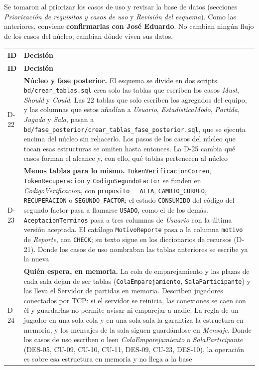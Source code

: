 Se tomaron al priorizar los casos de uso y revisar la base de datos (secciones \textit{Priorización de requisitos y casos de uso} y \textit{Revisión del esquema}). Como las anteriores, conviene \textbf{confirmarlas con José Eduardo}. No cambian ningún flujo de los casos del núcleo; cambian dónde viven sus datos.

\begin{center}\small
\begin{longtable}{|L{0.082\textwidth}|L{0.818\textwidth}|}
\hline
\textbf{ID} & \textbf{Decisión} \\ \hline
\endfirsthead
\hline
\textbf{ID} & \textbf{Decisión} \\ \hline
\endhead
\mbox{D-22} & \textbf{Núcleo y fase posterior.} El esquema se divide en dos scripts. \texttt{bd/crear\_\allowbreak{}tablas.sql} crea solo las tablas que escriben los casos \textit{Must}, \textit{Should} y \textit{Could}. Las 22 tablas que solo escriben los agregados del equipo, y las columnas que estos añadían a \textit{Usuario}, \textit{EstadisticaModo}, \textit{Partida}, \textit{Jugada} y \textit{Sala}, pasan a \texttt{bd/fase\_\allowbreak{}posterior/\allowbreak{}crear\_\allowbreak{}tablas\_\allowbreak{}fase\_\allowbreak{}posterior.sql}, que se ejecuta encima del núcleo sin rehacerlo. Los pasos de los casos del núcleo que tocan esas estructuras se omiten hasta entonces. La \mbox{D-25} cambia qué casos forman el alcance y, con ello, qué tablas pertenecen al núcleo \\ \hline
\mbox{D-23} & \textbf{Menos tablas para lo mismo.} \texttt{TokenVerificacionCorreo}, \texttt{TokenRecuperacion} y \texttt{CodigoSegundoFactor} se funden en \textit{CodigoVerificacion}, con \texttt{proposito} = \texttt{ALTA}, \texttt{CAMBIO\_\allowbreak{}CORREO}, \texttt{RECUPERACION} o \texttt{SEGUNDO\_\allowbreak{}FACTOR}; el estado \texttt{CONSUMIDO} del código del segundo factor pasa a llamarse \texttt{USADO}, como el de los demás. \texttt{AceptacionTerminos} pasa a tres columnas de \textit{Usuario} con la última versión aceptada. El catálogo \texttt{MotivoReporte} pasa a la columna \texttt{motivo} de \textit{Reporte}, con \texttt{CHECK}; su texto sigue en los diccionarios de recursos (\mbox{D-21}). Donde los casos de uso nombraban las tablas anteriores se escribe ya la nueva \\ \hline
\mbox{D-24} & \textbf{Quién espera, en memoria.} La cola de emparejamiento y las plazas de cada sala dejan de ser tablas (\texttt{ColaEmparejamiento}, \texttt{SalaParticipante}) y las lleva el Servidor de partidas en memoria. Describen jugadores conectados por TCP: si el servidor se reinicia, las conexiones se caen con él y guardarlas no permite avisar ni emparejar a nadie. La regla de un jugador en una sola cola y en una sola sala la garantiza la estructura en memoria, y los mensajes de la sala siguen guardándose en \textit{Mensaje}. Donde los casos de uso escriben o leen \textit{ColaEmparejamiento} o \textit{SalaParticipante} (\mbox{DES-05}, \mbox{CU-09}, \mbox{CU-10}, \mbox{CU-11}, \mbox{DES-09}, \mbox{CU-23}, \mbox{DES-10}), la operación es sobre esa estructura en memoria y no llega a la base \\ \hline

\end{longtable}
\end{center}
